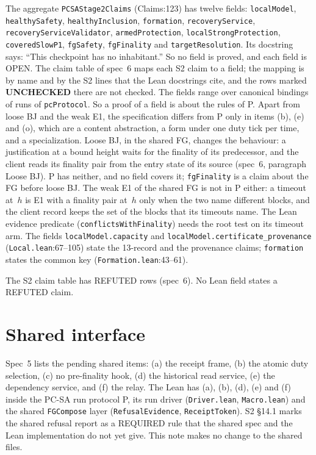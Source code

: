 \documentclass{article}
\newcommand{\nm}[1]{\nolinkurl{#1}}
\newcommand{\UC}{\textbf{UNCHECKED}}
\begin{document}
The aggregate \nm{PCSAStage2Claims} (Claims:123) has twelve fields:
\nm{localModel}, \nm{healthySafety}, \nm{healthyInclusion},
\nm{formation}, \nm{recoveryService}, \nm{recoveryServiceValidator},
\nm{armedProtection}, \nm{localStrongProtection}, \nm{coveredSlowP1},
\nm{fgSafety}, \nm{fgFinality} and \nm{targetResolution}.  Its docstring
says: ``This checkpoint has no inhabitant.''  So no field is proved, and
each field is OPEN.  The claim table of spec~6 maps each S2 claim to a
field; the mapping is by name and by the S2 lines that the Lean
docstrings cite, and the rows marked \UC{} there are not checked.  The
fields range over canonical bindings of runs of \nm{pcProtocol}.  So a
proof of a field is about the rules of P.  Apart from loose BJ and the
weak E1, the specification differs from P only in items (b), (e) and (o), which are a
content abstraction, a form under one duty tick per time, and a
specialization.  Loose BJ, in the shared FG, changes the behaviour: a
justification at a bound height waits for the finality of its
predecessor, and the client reads its finality pair from the entry state
of its source (spec~6, paragraph Loose BJ).  P has neither, and no field
covers it; \nm{fgFinality} is a claim about the FG before loose BJ.
The weak E1 of the shared FG is not in P either: a timeout at~$h$ is E1
with a finality pair at~$h$ only when the two name different blocks, and
the client record keeps the set of the blocks that its timeouts name.
The Lean evidence predicate (\nm{conflictsWithFinality}) needs the root
test on its timeout arm.
The fields \nm{localModel.capacity} and
\nm{localModel.certificate\_provenance} (\nm{Local.lean}:67--105) state the
13-record and the provenance claims; \nm{formation} states the common key
(\nm{Formation.lean}:43--61).

The S2 claim table has REFUTED rows (spec~6).  No Lean field states a
REFUTED claim.

\section{Shared interface}\label{sec:shared}

Spec~5 lists the pending shared items: (a) the receipt frame, (b) the
atomic duty selection, (c) no pre-finality hook, (d) the historical read
service, (e) the dependency service, and (f) the relay.  The Lean has (a),
(b), (d), (e) and (f) inside the PC-SA run protocol P, its run driver
(\nm{Driver.lean}, \nm{Macro.lean}) and the shared \nm{FGCompose} layer
(\nm{RefusalEvidence}, \nm{ReceiptToken}).  S2
\S14.1 marks the shared refusal report as a REQUIRED rule that the shared
spec and the Lean implementation do not yet give.  This note makes no
change to the shared files.
\end{document}
